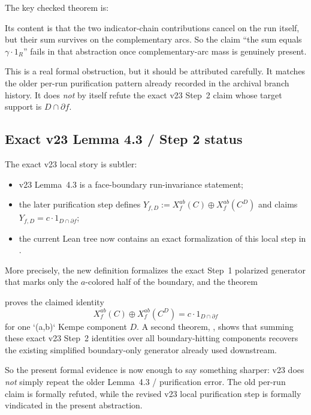 \documentclass[11pt]{article}
\begin{document}
The key checked theorem is:
\begin{quote}
\end{quote}

Its content is that the two indicator-chain contributions cancel on the run
itself, but their sum survives on the complementary arcs.  So the claim
``the sum equals \(\gamma \cdot 1_R\)'' fails in that abstraction once
complementary-arc mass is genuinely present.

This is a real formal obstruction, but it should be attributed carefully.  It
matches the older per-run purification pattern already recorded in the archival
branch history.  It does \emph{not} by itself refute the exact v23 Step~2 claim
whose target support is \(D \cap \partial f\).

\subsection{Exact v23 Lemma 4.3 / Step 2 status}

The exact v23 local story is subtler:
\begin{itemize}[leftmargin=2em]
\item v23 Lemma~4.3 is a face-boundary run-invariance statement;
\item the later purification step defines
\(Y_{f,D} := X_f^{ab}(C) \oplus X_f^{ab}(C^D)\) and claims
\(Y_{f,D} = c \cdot 1_{D \cap \partial f}\);
\item the current Lean tree now contains an exact formalization of this local
step in .
\end{itemize}

More precisely, the new definition
 formalizes the exact Step~1 polarized
generator that marks only the \(a\)-colored half of the boundary, and the
theorem
\begin{quote}
\end{quote}
proves the claimed identity
\[
X_f^{ab}(C) \oplus X_f^{ab}(C^D) = c \cdot 1_{D \cap \partial f}
\]
for one `(a,b)` Kempe component \(D\).  A second theorem,
, shows
that summing these exact v23 Step~2 identities over all boundary-hitting
components recovers the existing simplified boundary-only generator already used
downstream.

So the present formal evidence is now enough to say something sharper: v23 does
\emph{not} simply repeat the older Lemma~4.3 / purification error.  The old
per-run claim is formally refuted, while the revised v23 local purification
step is formally vindicated in the present abstraction.
\end{document}
